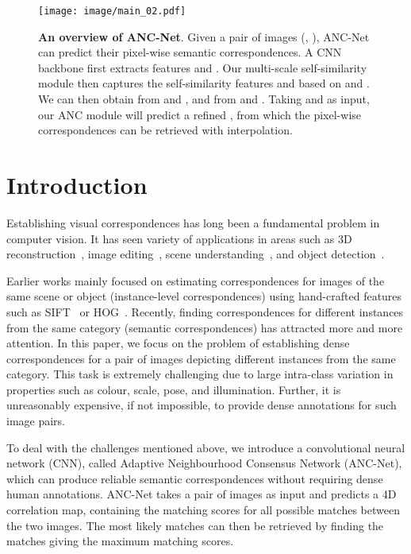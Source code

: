 \documentclass[10pt,twocolumn,letterpaper]{article}
\begin{document}
\begin{figure*}[!th]
\centering
  \texttt{[image: image/main\_02.pdf]}
  \caption{\textbf{An overview of ANC-Net}. Given a pair of images (, ), ANC-Net can predict their pixel-wise semantic correspondences. A CNN backbone  first extracts features  and . Our multi-scale self-similarity module then captures the self-similarity features  and  based on  and . We can then obtain  from  and , and  from  and . Taking  and  as input, our ANC module  will predict a refined , from which the pixel-wise correspondences can be retrieved with interpolation.
  }
\label{fig:overview}
\end{figure*}
\section{Introduction}
Establishing visual correspondences has long been a fundamental problem in computer vision. 
It has seen variety of applications in areas such as 3D reconstruction~\cite{Agarwal_ICCV09_BuildRome,Sattler_CVPR17_Benchmark_6DOF}, 
image editing~\cite{HaCohen11Non}, scene understanding~\cite{Liu_PAMI11_SIFT}, and object detection~\cite{Duchenne_ICCV11}.

Earlier works mainly focused on estimating correspondences for images of the same scene or object (\ie instance-level correspondences) using hand-crafted features such as SIFT~\cite{Lowe2004SIFT} or HOG~\cite{Dalal05HOG}. 
Recently, finding correspondences for different instances from the same category (\ie semantic correspondences) has attracted more and more attention\cite{Choy_NIPS16_UCN,han2017scnet,Rocco_NIPS18_NCNet,Huang_ICCV19_DCCNet,min2019hyperpixel}. 
In this paper, we focus on the problem of establishing dense correspondences for a pair of images depicting different instances from the same category.
This task is extremely challenging due to large intra-class variation in properties such as colour, scale, pose, and illumination.
Further, it is unreasonably expensive, if not impossible, to provide dense annotations for such image pairs. 

To deal with the challenges mentioned above, we introduce a convolutional neural network (CNN), called Adaptive Neighbourhood Consensus Network (ANC-Net), which can produce reliable semantic correspondences without requiring dense human annotations.
ANC-Net takes a pair of images as input and predicts a 4D correlation map, containing the matching scores for all possible matches between the two images.
The most likely matches can then be retrieved by finding the matches giving the maximum matching scores. 
\end{document}
